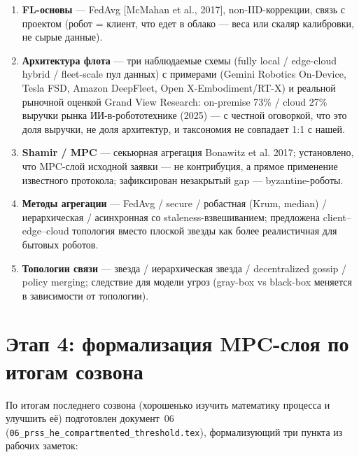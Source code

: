 \documentclass[11pt]{article}
\begin{document}
\begin{enumerate}[label=\textbf{0\arabic*.}, leftmargin=2.2cm]
  \item \textbf{FL-основы} — FedAvg [McMahan et al., 2017], non-IID-коррекции,
        связь с проектом (робот = клиент, что едет в облако — веса или скаляр
        калибровки, не сырые данные).
  \item \textbf{Архитектура флота} — три наблюдаемые схемы (fully local /
        edge-cloud hybrid / fleet-scale пул данных) с примерами (Gemini Robotics
        On-Device, Tesla FSD, Amazon DeepFleet, Open X-Embodiment/RT-X) и реальной
        рыночной оценкой Grand View Research: on-premise 73\% / cloud 27\% выручки
        рынка ИИ-в-робототехнике (2025) — с честной оговоркой, что это доля
        выручки, не доля архитектур, и таксономия не совпадает 1:1 с нашей.
  \item \textbf{Shamir / MPC} — секьюрная агрегация Bonawitz et al. 2017;
        установлено, что MPC-слой исходной заявки — не контрибуция, а прямое
        применение известного протокола; зафиксирован незакрытый gap —
        byzantine-роботы.
  \item \textbf{Методы агрегации} — FedAvg / secure / робастная (Krum, median) /
        иерархическая / асинхронная со staleness-взвешиванием; предложена
        client--edge--cloud топология вместо плоской звезды как более реалистичная
        для бытовых роботов.
  \item \textbf{Топологии связи} — звезда / иерархическая звезда / decentralized
        gossip / policy merging; следствие для модели угроз (gray-box vs black-box
        меняется в зависимости от топологии).
\end{enumerate}

\section{Этап 4: формализация MPC-слоя по итогам созвона}

По итогам последнего созвона (\guillemotleft хорошенько изучить математику
процесса и улучшить её\guillemotright) подготовлен документ~06
(\texttt{06\_prss\_he\_compartmented\_threshold.tex}), формализующий три пункта из
рабочих заметок:
\end{document}
